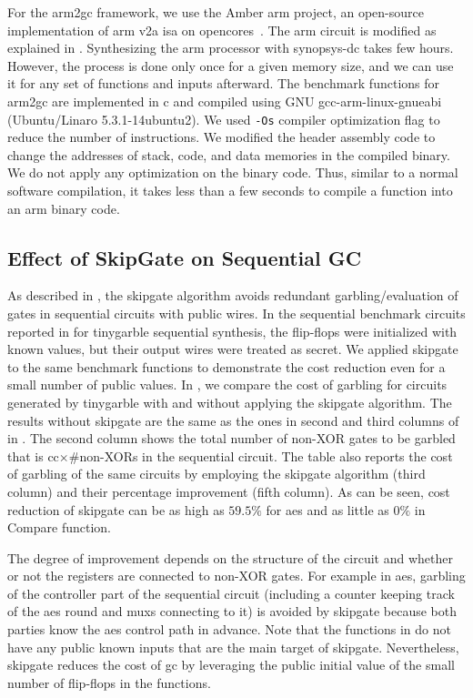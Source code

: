For the \gls{arm2gc} framework, we use the Amber \gls{arm} project, an open-source implementation of \gls{arm} v2a \acrshort{isa} on opencores~\cite{santifort2010amber}.
The \gls{arm} circuit is modified as explained in .
Synthesizing the \gls{arm} processor with \gls{synopsys-dc} takes few hours.
However, the process is done only once for a given memory size, and we can use it for any set of functions and inputs afterward.
The benchmark functions for \gls{arm2gc} are implemented in \gls{c} and compiled using GNU gcc-arm-linux-gnueabi (Ubuntu/Linaro 5.3.1-14ubuntu2).
We used \texttt{-Os} compiler optimization flag to reduce the number of instructions.
We modified the header assembly code to change the addresses of stack, code, and data memories in the compiled binary.
We do not apply any optimization on the binary code.
Thus, similar to a normal software compilation, it takes less than a few seconds to compile a function into an \gls{arm} binary code.

\subsection{Effect of {SkipGate} on Sequential GC}
As described in , the \gls{skipgate} algorithm avoids redundant garbling/evaluation of gates in sequential circuits with public wires.
In the sequential benchmark circuits reported in  for \gls{tinygarble} sequential synthesis, the flip-flops were initialized with known values, but their output wires were treated as secret.
We applied \gls{skipgate} to the same benchmark functions to demonstrate the cost reduction even for a small number of public values.
In , we compare the cost of garbling for circuits generated by \gls{tinygarble} with and without applying the \gls{skipgate} algorithm.
The results without \gls{skipgate} are the same as the ones in second and third columns of  in .
The second column shows the total number of non-XOR gates to be garbled that is cc$\times$\#non-XORs in the sequential circuit.
The table also reports the cost of garbling of the same circuits by employing the \gls{skipgate} algorithm (third column) and their percentage improvement (fifth column).
As can be seen, cost reduction of \gls{skipgate} can be as high as $59.5\%$ for \acrshort{aes} and as little as $0\%$ in Compare function.

The degree of improvement depends on the structure of the circuit and whether or not the registers are connected to non-XOR gates.
For example in \acrshort{aes}, garbling of the controller part of the sequential circuit (including a counter keeping track of the \acrshort{aes} round and \acrfull{mux}s connecting to it) is avoided by \gls{skipgate} because both parties know the \acrshort{aes} control path in advance.
Note that the functions in  do not have any public known inputs that are the main target of \gls{skipgate}.
Nevertheless, \gls{skipgate} reduces the cost of \acrshort{gc} by leveraging the public initial value of the small number of flip-flops in the functions.

